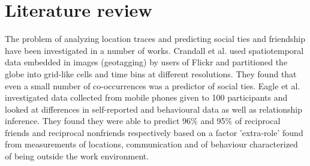 \section{Literature review}
The problem of analyzing location traces and predicting social ties and friendship have been investigated in a number of works. Crandall et al.\cite{ISTfGC} used spatiotemporal data embedded in images (geotagging) by users of Flickr and partitioned the globe into grid-like cells and time bins at different resolutions. They found that even a small number of co-occurrences was a predictor of social ties. 
Eagle et al.\cite{eagle} investigated data collected from mobile phones given to 100 participants and looked at differences in self-reported and behavioural data as well as relationship inference. They found they were able to predict 96\% and 95\% of reciprocal friends and reciprocal nonfriends respectively based on a factor 'extra-role' found from measurements of locations, communication and of behaviour characterized of being outside the work environment.
